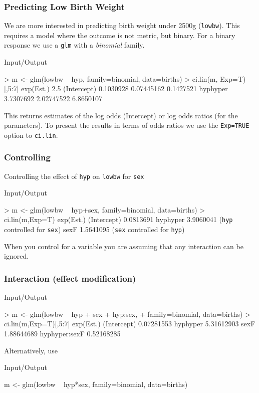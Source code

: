 \documentclass[xcolor={table}]{beamer}
\begin{document}
\begin{frame}[fragile]\frametitle{Predicting Low Birth Weight}
We are more interested in predicting birth weight under 2500g (\texttt{lowbw}). This requires a model where the outcome is not metric, but binary. For a binary response we use a \texttt{glm} with a \emph{binomial} family.
\begin{exampleblock}{Input/Output}
\begin{semiverbatim}\small
> m <- glm(lowbw ~ hyp, family=binomial, data=births)
> ci.lin(m, Exp=T)[,5:7]
            exp(Est.)       2.5%
(Intercept) 0.1030928 0.07445162 0.1427521
hyphyper    3.7307692 2.02747522 6.8650107
\end{semiverbatim}
\end{exampleblock}
This returns estimates of the log odds (Intercept) or log odds ratios (for the parameters). To present the results in terms of odds ratios we use the \verb|Exp=TRUE| option to \texttt{ci.lin}.
\end{frame}

\begin{frame}[fragile]\frametitle{Controlling}
Controlling the effect of \texttt{hyp} on \texttt{lowbw} for \texttt{sex}
\begin{exampleblock}{Input/Output}
\begin{semiverbatim}\small
> m <- glm(lowbw ~ hyp+sex, family=binomial, data=births)
> ci.lin(m,Exp=T)
              exp(Est.) 
(Intercept)   0.0813691 
hyphyper      3.9060041 (\texttt{hyp} controlled for \texttt{sex})
sexF          1.5641095 (\texttt{sex} controlled for \texttt{hyp})
\end{semiverbatim}
\end{exampleblock}
When you control for a variable you are assuming that any interaction can be ignored.
\end{frame}


\begin{frame}[fragile]\frametitle{Interaction (effect modification)}
\begin{exampleblock}{Input/Output}
\begin{semiverbatim}
> m <- glm(lowbw ~ hyp + sex + hyp:sex, 
+           family=binomial, data=births)
> ci.lin(m,Exp=T)[,5:7]
               exp(Est.)
(Intercept)   0.07281553
hyphyper      5.31612903
sexF          1.88644689
hyphyper:sexF 0.52168285 
\end{semiverbatim}
\end{exampleblock}
Alternatively, use
\begin{exampleblock}{Input/Output}
\begin{semiverbatim}
m <- glm(lowbw ~ hyp*sex, family=binomial, data=births)
\end{semiverbatim}
\end{exampleblock}

\end{frame}
\end{document}
